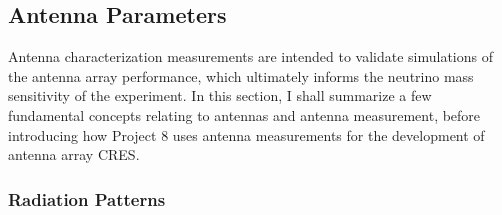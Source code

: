 \subsection{Antenna Parameters}
\label{sec:ant-meas-fun}

Antenna characterization measurements are intended to validate simulations of the antenna array performance, which ultimately informs the neutrino mass sensitivity of the experiment. In this section, I shall summarize a few fundamental concepts relating to antennas and antenna measurement, before introducing how Project 8 uses antenna measurements for the development of antenna array CRES.

\subsubsection{Radiation Patterns}

